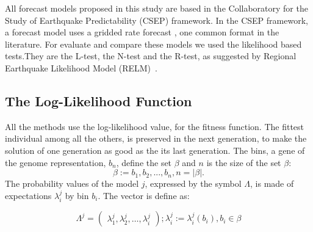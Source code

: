 All forecast models proposed in this study are based in the Collaboratory for the Study of Earthquake Predictability (CSEP) framework. In the CSEP framework, a forecast model uses a gridded rate forecast \cite{zechar2010evaluating}, one common format in the literature. For evaluate and compare these models we used the likelihood based tests.They are the L-test, the N-test and the R-test, as suggested by Regional Earthquake Likelihood Model (RELM)~\cite{schorlemmer2007earthquake}.\\
 





\subsection{The Log-Likelihood Function}
All the methods use the log-likelihood value, for the fitness
function. The fittest individual among all the others, is preserved in
the next generation, to make the solution of one generation as good as
the its last generation.  The bins, a gene of the genome
representation, $b_n$, define the set $\beta$ and $n$ is the size of
the set $\beta$:
\begin{equation} 
\beta := {b_1,b_2,...,b_n},n = |\beta|.
\end{equation}
The probability values of the model $j$, expressed by the symbol
$\Lambda$, is made of expectations $\lambda_i^j$ by bin $b_i$. The
vector is define as:
				
\begin{equation}
	\Lambda^j = 
\begin{pmatrix}
    \lambda_1^j, 
    \lambda_2^j, 
    \hdots,
    \lambda_i^j
  \end{pmatrix}
  ;\lambda_i^j := \lambda_i^j(b_i),b_i \in \beta
\end{equation}
		

